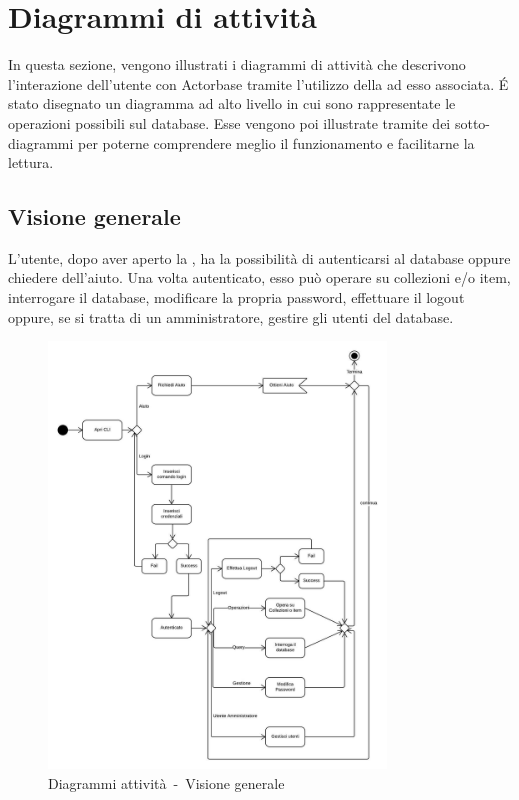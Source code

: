 \documentclass{scalatekids-article}
\begin{document}
\section{Diagrammi di attività}

In questa sezione, vengono illustrati i diagrammi di attività che descrivono
l'interazione dell'utente con Actorbase tramite l'utilizzo della 
ad esso associata.  É stato disegnato un diagramma ad alto livello in cui sono
rappresentate le operazioni possibili sul database. Esse vengono poi
illustrate tramite dei sotto-diagrammi per poterne comprendere meglio il
funzionamento e facilitarne la lettura.

\subsection{Visione generale}

L'utente, dopo aver aperto la , ha la possibilità di autenticarsi
al database oppure chiedere dell'aiuto. Una volta autenticato, esso può
operare su collezioni e/o item, interrogare il database, modificare la propria
password, effettuare il logout oppure, se si tratta di un amministratore,
gestire gli utenti del database.

\begin{figure}[H]
  \begin{center}
    \includegraphics[width=0.8\textwidth, keepaspectratio]{img/diagrammiAttivita/visioneGenerale.jpeg}
    \caption{Diagrammi attività\ -\ Visione generale}
  \end{center}
\end{figure}
\end{document}
